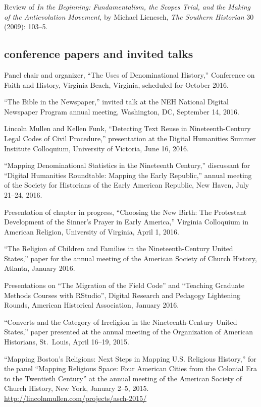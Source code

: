 \documentclass[11pt]{article}
\begin{document}
Review of \emph{In the Beginning: Fundamentalism, the Scopes Trial, and
  the Making of the Antievolution Movement}, by Michael Lienesch,
\emph{The Southern Historian} 30 (2009): 103--5.

\subsection{conference papers and invited 
  talks}\label{conference-papers-invited-talks}

Panel chair and organizer, ``The Uses of Denominational History,'' Conference 
on Faith and History, Virginia Beach, Virginia, scheduled for October 2016.

``The Bible in the Newspaper,'' invited talk at the NEH National Digital 
Newspaper Program annual meeting, Washington, DC, September 14, 2016.

Lincoln Mullen and Kellen Funk, ``Detecting Text Reuse in Nineteenth-Century 
Legal Codes of Civil Procedure,'' presentation at the Digital Humanities 
Summer Institute Colloquium, University of Victoria, June 16, 2016.

``Mapping Denominational Statistics in the Nineteenth Century,'' discussant 
for ``Digital Humanities Roundtable: Mapping the Early Republic,'' annual 
meeting of the Society for Historians of the Early American Republic, New 
Haven, July 21--24, 2016.

Presentation of chapter in progress, ``Choosing the New Birth: The Protestant 
Development of the Sinner's Prayer in Early America,'' Virginia Colloquium in 
American Religion, University of Virginia, April 1, 2016.

``The Religion of Children and Families in the Nineteenth-Century United 
States,'' paper for the annual meeting of the American Society of 
Church History, Atlanta, January 2016.

Presentations on ``The Migration of the Field Code'' and ``Teaching 
Graduate Methods Courses with RStudio'', Digital Research and Pedagogy 
Lightening Rounds, American Historical Association, January 2016.

``Converts and the Category of Irreligion in the Nineteenth-Century
United States,'' paper presented at the annual meeting of the
Organization of American Historians, St.~Louis, April 16--19, 2015.

``Mapping Boston's Religions: Next Steps in Mapping U.S. Religious History,'' 
for the panel ``Mapping Religious Space: Four American Cities from the 
Colonial Era to the Twentieth Century'' at the annual meeting of the American 
Society of Church History, New York, January 2--5, 2015.  
\url{http://lincolnmullen.com/projects/asch-2015/}
\end{document}
